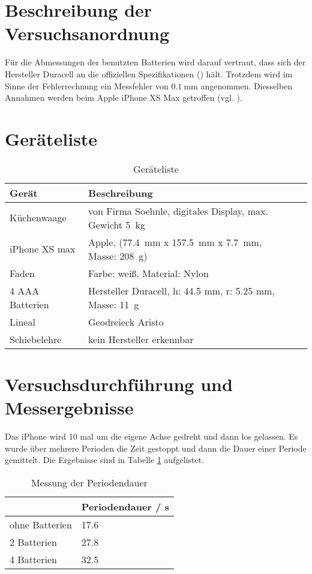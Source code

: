 \documentclass{article}
\begin{document}
\section{Beschreibung der Versuchsanordnung}

Für die Abmessungen der benutzten Batterien wird darauf vertraut, dass sich der Hersteller Duracell an die offiziellen Spezifikationen (\cite{duracell}) hält. Trotzdem wird im Sinne der Fehlerrechnung ein Messfehler von $0.1~$mm angenommen. Diesselben Annahmen werden beim Apple iPhone XS Max getroffen (vgl. \cite{apple}).




\section{Geräteliste}




\begin{table}[H]
\caption{Geräteliste}



\begin{tabular}{lll}
Gerät  & Beschreibung \\
\hline
Küchenwaage & von Firma Soehnle, digitales Display, max. Gewicht 5~kg \\
iPhone XS max & Apple, (77.4~mm x 157.5~mm x 7.7~mm, Masse: 208~g)\\
Faden & Farbe: weiß, Material: Nylon \\
4 AAA Batterien & Hersteller Duracell, h: 44.5 mm, r: 5.25 mm, Masse: 11~g \\
Lineal & Geodreieck Aristo \\
Schiebelehre & kein Hersteller erkennbar
\end{tabular}
\end{table}

\newpage
\section{Versuchsdurchführung und Messergebnisse}

Das iPhone wird 10 mal um die eigene Achse gedreht und dann los gelassen. Es wurde über mehrere Perioden die Zeit gestoppt und dann die Dauer einer Periode gemittelt. Die Ergebnisse sind in Tabelle \ref{tab:periodendauer} aufgelistet.


\begin{table}[H]
\caption{Messung der Periodendauer}
\label{tab:periodendauer}
\begin{tabular}{l|l}
& Periodendauer / s \\
\hline
ohne Batterien & 17.6 \\
2 Batterien & 27.8 \\
4 Batterien & 32.5
\end{tabular}
\end{table}
\end{document}
